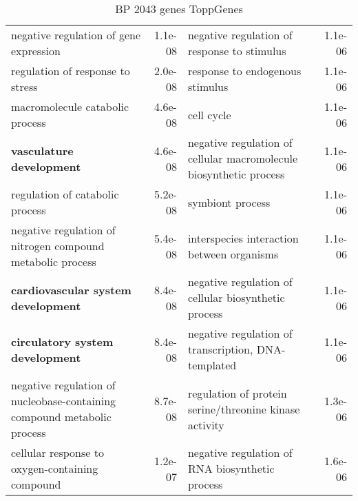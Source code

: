 \documentclass[fleqn,10pt]{SelfArx} %
\begin{document}
\begin{table}[ht]
\begin{tabularx}{\textwidth}{lRlR}
		negative regulation of gene expression & 1.1e-08 & negative regulation of response to stimulus & 1.1e-06 \\ 
		regulation of response to stress & 2.0e-08 & response to endogenous stimulus & 1.1e-06 \\ 
		macromolecule catabolic process & 4.6e-08 & cell cycle & 1.1e-06 \\ 
		\textbf{vasculature development} & 4.6e-08 & negative regulation of cellular macromolecule biosynthetic process & 1.1e-06 \\ 
		regulation of catabolic process & 5.2e-08 & symbiont process & 1.1e-06 \\ 
		negative regulation of nitrogen compound metabolic process & 5.4e-08 & interspecies interaction between organisms & 1.1e-06 \\ 
		\textbf{cardiovascular system development} & 8.4e-08 & negative regulation of cellular biosynthetic process & 1.1e-06 \\ 
		\textbf{circulatory system development} & 8.4e-08 & negative regulation of transcription, DNA-templated & 1.1e-06 \\ 
		negative regulation of nucleobase-containing compound metabolic process & 8.7e-08 & regulation of protein serine/threonine kinase activity & 1.3e-06 \\ 
		cellular response to oxygen-containing compound & 1.2e-07 & negative regulation of RNA biosynthetic process & 1.6e-06 \\ 
	\end{tabularx}
	\smallskip
	\caption{BP 2043 genes ToppGenes}
	\label{tab:bp2043}
\end{table}
\end{document}
